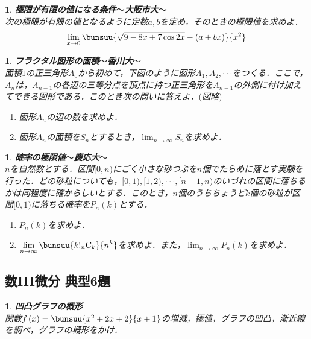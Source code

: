 \documentclass[10pt,
fleqn,
dvipdfmx,
uplatex
]{jsarticle}
\newtheorem{question}[Question]{}
\begin{document}
\begin{question}{\bf\boldmath 極限が有限の値になる条件$〜$大阪市大$〜$}\\
次の極限が有限の値となるように定数$a, b$を定め，そのときの極限値を求めよ．
\[\displaystyle\lim_{x\to 0}\bunsuu{{\sqrt {9-8x+7\cos 2x}-\left(a+bx\right)}}{{x^2}}\]
\end{question}



\begin{question}{\bf\boldmath フラクタル図形の面積$〜$香川大$〜$}\\
面積$1$の正三角形$A_0$から初めて，下図のように図形$A_1, A_2, \cdot \cdot \cdot$をつくる．ここで，$A_n$は，$A_{n-1}$の各辺の三等分点を頂点に持つ正三角形を$A_{n-1}$の外側に付け加えてできる図形である．このとき次の問いに答えよ．$($図略$)$
\begin{enumerate}
\item 図形$A_n$の辺の数を求めよ．
\item 図形$A_n$の面積を$S_n$とするとき，$\displaystyle\lim_{n\to \infty }S_n$を求めよ．
\end{enumerate}

\end{question}



\begin{question}{\bf\boldmath 確率の極限値$〜$慶応大$〜$}\\
$n$を自然数とする．区間$[0,n)$にごく小さな砂つぶを$n$個でたらめに落とす実験を行った．どの砂粒についても，$[0,1), [1,2), \cdot \cdot \cdot , [n-1,n)$のいづれの区間に落ちるかは同程度に確からしいとする．このとき，$n$個のうちちょうど$k$個の砂粒が区間$[0,1)$に落ちる確率を$P_n\left(k\right)$とする．
\begin{enumerate}
\item $P_n\left(k\right)$を求めよ．
\item $\displaystyle\lim_{n\to \infty }\bunsuu{{k!_n\text{C}_k}}{{n^k}}$を求めよ．また，$\displaystyle\lim_{n\to \infty }P_n\left(k\right)$を求めよ．
\end{enumerate}

\end{question}

\subsection{数III微分 典型6題}



\begin{question}{\bf\boldmath 凹凸グラフの概形}\\
関数$f\left(x\right)=\bunsuu{{x^2+2x+2}}{{x+1}}$の増減，極値，グラフの凹凸，漸近線を調べ，グラフの概形をかけ．
\end{question}
\end{document}
